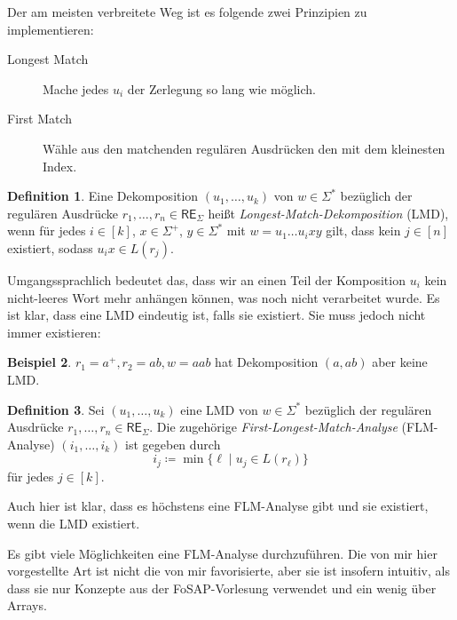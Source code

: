 \documentclass[11pt, a4paper]{article}
\theoremstyle{definition}
\newtheorem{definition}{Definition}[section]
\newtheorem{example}[definition]{Beispiel}
\theoremstyle{plain}
\numberwithin{equation}{section}
\begin{document}
Der am meisten verbreitete Weg ist es folgende zwei Prinzipien zu implementieren:
\begin{description}
	\item[Longest Match] Mache jedes $u_i$ der Zerlegung so lang wie möglich.
	\item[First Match] Wähle aus den matchenden regulären Ausdrücken den mit dem kleinesten Index.
\end{description}

\begin{definition}
	Eine Dekomposition $(u_1, \ldots, u_k)$ von $w \in \Sigma^\ast$ bezüglich der regulären Ausdrücke $r_1, \ldots, r_n \in \mathsf{RE}_\Sigma$ heißt \textit{Longest-Match-Dekomposition} (LMD), wenn für jedes $i \in [k]$, $x \in \Sigma^+$, $y \in \Sigma^\ast$ mit $w = u_1 \ldots u_i x y$ gilt, dass kein $j \in [n]$ existiert, sodass $u_i x \in L(r_j)$. 
\end{definition}
Umgangssprachlich bedeutet das, dass wir an einen Teil der Komposition $u_i$ kein nicht-leeres Wort mehr anhängen können, was noch nicht verarbeitet wurde.
Es ist klar, dass eine LMD eindeutig ist, falls sie existiert. Sie muss jedoch nicht immer existieren:

\begin{example}
	$r_1 = a^+, r_2 = ab, w = aab$ hat Dekomposition $(a, ab)$ aber keine LMD.
\end{example}

\begin{definition}
	Sei $(u_1, \ldots, u_k)$ eine LMD von $w \in \Sigma^\ast$ bezüglich der regulären Ausdrücke $r_1, \ldots, r_n \in \mathsf{RE}_\Sigma$. Die zugehörige \textit{First-Longest-Match-Analyse} (FLM-Analyse) $(i_1, \ldots, i_k)$ ist gegeben durch
	$$
		i_j \coloneqq \min \{ \ell \mid u_j \in L(r_\ell) \}
	$$
	für jedes $j \in [k]$.
\end{definition}
Auch hier ist klar, dass es höchstens eine FLM-Analyse gibt und sie existiert, wenn die LMD existiert.


Es gibt viele Möglichkeiten eine FLM-Analyse durchzuführen. Die von mir hier vorgestellte Art ist nicht die von mir favorisierte, aber sie ist insofern intuitiv, als dass sie nur Konzepte aus der FoSAP-Vorlesung verwendet und ein wenig über Arrays.
\end{document}
